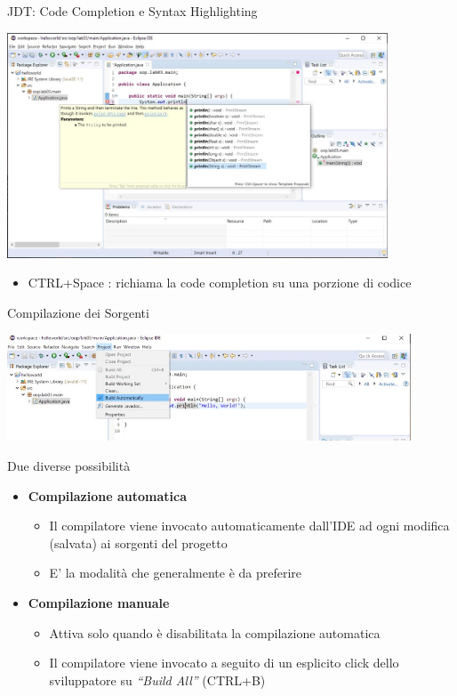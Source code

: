 \documentclass[presentation]{beamer}
\begin{document}
\begin{frame}{JDT: Code Completion e Syntax Highlighting}
\begin{center}
\includegraphics[width=0.85\textwidth]{img/eclipse-screenshots/eclipse-ide-03.jpg}
\end{center}
\begin{itemize}
\item CTRL+Space : richiama la code completion su una porzione di codice
\end{itemize}
\end{frame}

\begin{frame}{Compilazione dei Sorgenti}
\begin{center}
\includegraphics[width=0.9\textwidth]{img/eclipse-screenshots/eclipse-ide-04a.jpg}
\end{center}
\begin{block}{Due diverse possibilità}
\begin{itemize}
\item \textbf{Compilazione automatica}
\begin{itemize}
\item Il compilatore viene invocato automaticamente dall'IDE ad ogni modifica (salvata) ai sorgenti del progetto
\item E' la modalità che generalmente è da preferire
\end{itemize}
\item \textbf{Compilazione manuale}
\begin{itemize}
\item Attiva solo quando è disabilitata la compilazione automatica
\item Il compilatore viene invocato a seguito di un esplicito click dello sviluppatore su \textit{``Build All''} (CTRL+B)
\end{itemize}
\end{itemize}
\end{block}
\end{frame}
\end{document}
